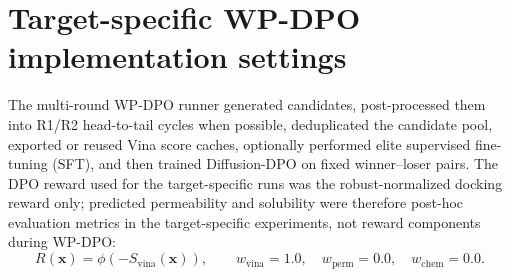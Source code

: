\documentclass[12pt]{article}
\begin{document}
\section{Target-specific WP-DPO implementation settings}
\label{supsec:target_dpo_settings}

The multi-round WP-DPO runner generated candidates, post-processed them into R1/R2 head-to-tail cycles when possible, deduplicated the candidate pool, exported or reused Vina score caches, optionally performed elite supervised fine-tuning (SFT), and then trained Diffusion-DPO on fixed winner--loser pairs.
The DPO reward used for the target-specific runs was the robust-normalized docking reward only; predicted permeability and solubility were therefore post-hoc evaluation metrics in the target-specific experiments, not reward components during WP-DPO:
\[
R(\mathbf{x})=\phi(-S_{\mathrm{vina}}(\mathbf{x})),
\qquad
w_{\mathrm{vina}}=1.0,\quad
w_{\mathrm{perm}}=0.0,\quad
w_{\mathrm{chem}}=0.0.
\]
\end{document}
